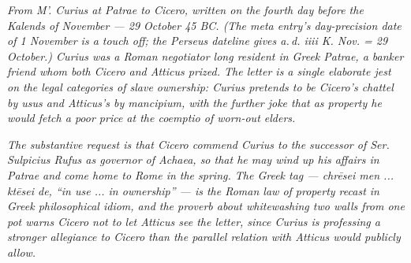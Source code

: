 
\textit{From M'. Curius at Patrae to Cicero, written on the fourth
day before the Kalends of November --- 29 October 45 BC. (The meta
entry's day-precision date of 1 November is a touch off; the
Perseus dateline gives \textit{a.\,d. iiii K. Nov.} = 29 October.)
Curius was a Roman \textit{negotiator} long resident in Greek
Patrae, a banker friend whom both Cicero and Atticus prized. The
letter is a single elaborate jest on the legal categories of slave
ownership: Curius pretends to be Cicero's chattel by \textit{usus}
and Atticus's by \textit{mancipium}, with the further joke that as
property he would fetch a poor price at the \textit{coemptio} of
worn-out elders.}

\textit{The substantive request is that Cicero commend Curius to
the successor of Ser. Sulpicius Rufus as governor of Achaea, so
that he may wind up his affairs in Patrae and come home to Rome in
the spring. The Greek tag --- \textit{chrēsei men ... ktēsei de},
``in use ... in ownership'' --- is the Roman law of property
recast in Greek philosophical idiom, and the proverb about
whitewashing two walls from one pot warns Cicero not to let
Atticus see the letter, since Curius is professing a stronger
allegiance to Cicero than the parallel relation with Atticus
would publicly allow.}
